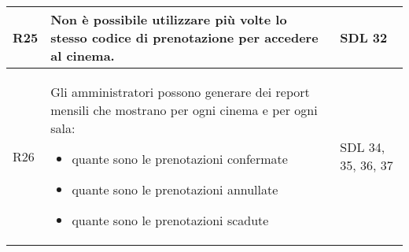 \begin{longtable}{|p{0.8cm}|p{13.4cm}|p{2.1cm}|}
      R25                                                                     &
      Non è possibile utilizzare più volte lo stesso codice di prenotazione
      per accedere al cinema.                                                 &
      SDL 32
      \\\hline
      R26                                                                     &
      Gli amministratori possono generare dei report mensili che mostrano
      per ogni cinema e per ogni sala:
      \begin{itemize}
            \item quante sono le prenotazioni confermate
            \item quante sono le prenotazioni annullate
            \item quante sono le prenotazioni scadute
      \end{itemize}                            &
      SDL 34, 35, 36, 37
      \\\hline
\end{longtable}

\pagebreak

